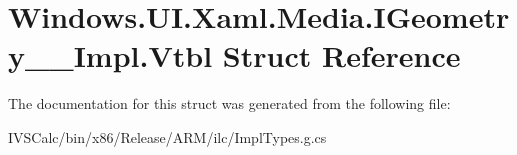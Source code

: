 \hypertarget{struct_windows_1_1_u_i_1_1_xaml_1_1_media_1_1_i_geometry_____impl_1_1_vtbl}{}\section{Windows.\+U\+I.\+Xaml.\+Media.\+I\+Geometry\+\_\+\+\_\+\+Impl.\+Vtbl Struct Reference}
\label{struct_windows_1_1_u_i_1_1_xaml_1_1_media_1_1_i_geometry_____impl_1_1_vtbl}


The documentation for this struct was generated from the following file\+:\begin{DoxyCompactItemize}
\item 
I\+V\+S\+Calc/bin/x86/\+Release/\+A\+R\+M/ilc/Impl\+Types.\+g.\+cs\end{DoxyCompactItemize}

